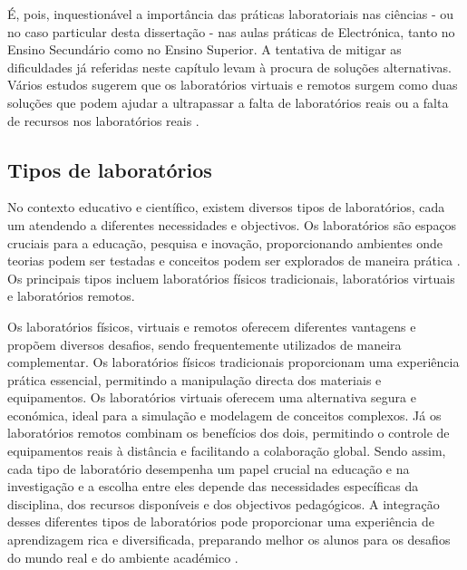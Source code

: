 É, pois, inquestionável a importância das práticas laboratoriais nas ciências - ou no caso particular desta dissertação - nas aulas práticas de Electrónica, tanto no Ensino Secundário como no Ensino Superior. A tentativa de mitigar as dificuldades já referidas neste capítulo levam à procura de soluções alternativas. Vários estudos sugerem que os laboratórios virtuais e remotos surgem como duas soluções que podem ajudar a ultrapassar a falta de laboratórios reais ou a falta de recursos nos laboratórios reais \cite{ImpactRemoteLabTeachingPractices, developremotelabs, HERADIO20161, POTKONJAK2016309}.


\subsection{Tipos de laboratórios} %
\label{sec:tiposlaboratorios}
No contexto educativo e científico, existem diversos tipos de laboratórios, cada um atendendo a diferentes necessidades e objectivos. Os laboratórios são espaços cruciais para a educação, pesquisa e inovação, proporcionando ambientes onde teorias podem ser testadas e conceitos podem ser explorados de maneira prática \cite{Hofsteinfoundations}. Os principais tipos incluem laboratórios físicos tradicionais, laboratórios virtuais e laboratórios remotos.

Os laboratórios físicos, virtuais e remotos oferecem diferentes vantagens e propõem diversos desafios, sendo frequentemente utilizados de maneira complementar. Os laboratórios físicos tradicionais proporcionam uma experiência prática essencial, permitindo a manipulação directa dos materiais e equipamentos. Os laboratórios virtuais oferecem uma alternativa segura e económica, ideal para a simulação e modelagem de conceitos complexos. Já os laboratórios remotos combinam os benefícios dos dois, permitindo o controle de equipamentos reais à distância e facilitando a colaboração global. Sendo assim, cada tipo de laboratório desempenha um papel crucial na educação e na investigação e a escolha entre eles depende das necessidades específicas da disciplina, dos recursos disponíveis e dos objectivos pedagógicos. A integração desses diferentes tipos de laboratórios pode proporcionar uma experiência de aprendizagem rica e diversificada, preparando melhor os alunos para os desafios do mundo real e do ambiente académico \cite{BRINSON2015218, ImpactRemoteLabTeachingPractices, Hofsteinfoundations}.

